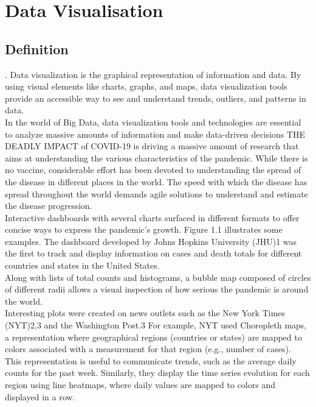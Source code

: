 
\chapter{Data Visualisation}
\section{Definition}.
Data visualization is the graphical representation of information and data. By using visual elements like charts, graphs, and maps, data visualization tools provide an accessible way to see and understand trends, outliers, and patterns in data.\\

In the world of Big Data, data visualization tools and technologies are essential to analyze massive amounts of information and make data-driven decisions
THE DEADLY IMPACT of COVID-19 is driving a massive amount of research that aims at understanding the various characteristics of the pandemic. While there is no vaccine, considerable effort has been devoted to understanding the spread of the disease in different places in the world. The speed with which the disease has spread throughout the world demands agile solutions to understand and estimate the disease progression.\\

Interactive dashboards with several charts surfaced in different formats to offer concise ways to express the pandemic’s growth. Figure 1.1 illustrates some examples. The dashboard developed by Johns Hopkins University (JHU)1 was the first to track and display information on cases and death totals for different countries and states in the United States.\\

Along with lists of total counts and histograms, a bubble map composed of circles of different radii allows a visual inspection of how serious the pandemic is around the world.\\

Interesting plots were created on news outlets such as the New York Times (NYT)2,3 and the Washington Post.3 For example, NYT used Choropleth maps, a representation where geographical regions (countries or states) are mapped to colors associated with a measurement for that region (e.g., number of cases).\\

This representation is useful to communicate trends, such as the average daily counts for the past week. Similarly, they display the time series evolution for each region using line heatmaps, where daily values are mapped to colors and displayed in a row.\\

